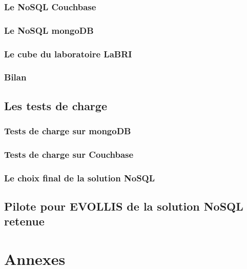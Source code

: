                 \section{Le \textsf{NoSQL Couchbase}}\label{membase}
%                

                \section{Le \textsf{NoSQL mongoDB}}\label{mongodb}
%                

                \section{Le \textsf{cube} du laboratoire \textsf{LaBRI}}\label{cube}
%                

                \section{Bilan}

      \chapter{Les tests de charge}

                \section{Tests de charge sur \textsf{mongoDB}}

                \section{Tests de charge sur \textsf{Couchbase}}
     
                \section{Le choix final de la solution \textsf{NoSQL}}

      \chapter{Pilote pour \textsf{EVOLLIS} de la solution \textsf{NoSQL} retenue}

%      

\printindex




\part{Annexes}
\appendix




